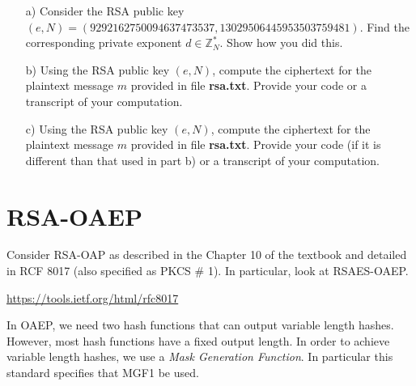 \documentclass[12pt, letterpaper]{article}
\newcommand{\bgreen}[1]{\textbf{\textcolor{green!50!black}{#1}}}
\begin{document}
\begin{itemize}

\item[a)] Consider the RSA public key 
$(e,N) = (9292162750094637473537, 13029506445953503759481)$.
Find the corresponding private exponent $d \in \mathbb{Z}_N^*$.  
Show how you did this. 



\item[b)] Using the RSA public key $(e,N)$, compute the ciphertext for the plaintext message $m$ provided in 
file \bgreen{rsa.txt}.
Provide your code or a transcript of your computation.


\item[c)] Using the RSA public key $(e,N)$, compute the ciphertext for the plaintext message $m$ provided in 
file \bgreen{rsa.txt}.
Provide your code (if it is different than that used in part b) 
or a transcript of your computation.




\end{itemize}



\section{RSA-OAEP}

Consider RSA-OAP as described in the Chapter 10 of the textbook and detailed in RCF 8017 (also specified as PKCS \# 1). In particular, look at RSAES-OAEP. 

\medskip

\url{https://tools.ietf.org/html/rfc8017}

\medskip

In OAEP, we need two hash functions that can output variable length hashes. However, most hash functions have a fixed output length. In order to achieve variable length hashes, we use a \emph{Mask Generation Function}. In particular this standard specifies that MGF1 be used. 
\end{document}
